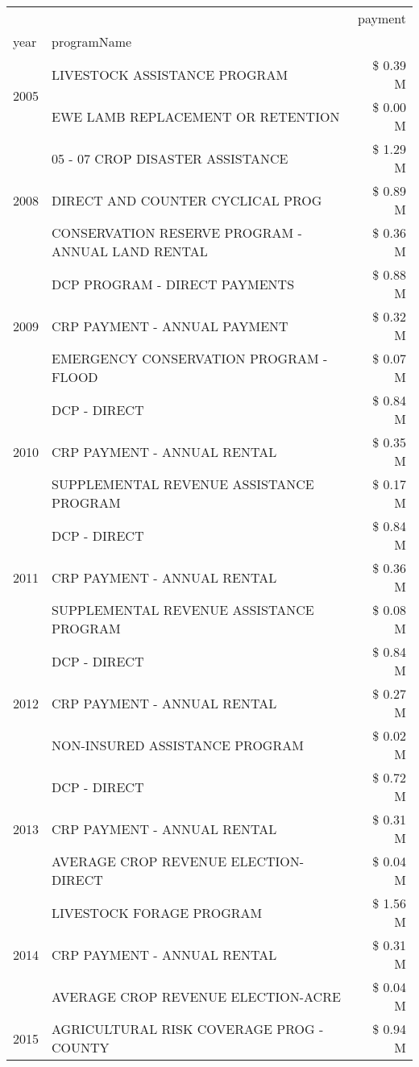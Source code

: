 \begin{tabular}{llr}
\toprule
 &  & payment \\
year & programName &  \\
\midrule
\multirow[t]{2}{*}{2005} & LIVESTOCK ASSISTANCE PROGRAM & \$ 0.39 M \\
 & EWE LAMB REPLACEMENT OR RETENTION & \$ 0.00 M \\
\cline{1-3}
\multirow[t]{3}{*}{2008} & 05 - 07 CROP DISASTER ASSISTANCE & \$ 1.29 M \\
 & DIRECT AND COUNTER CYCLICAL PROG & \$ 0.89 M \\
 & CONSERVATION RESERVE PROGRAM - ANNUAL LAND RENTAL & \$ 0.36 M \\
\cline{1-3}
\multirow[t]{3}{*}{2009} & DCP PROGRAM - DIRECT PAYMENTS & \$ 0.88 M \\
 & CRP PAYMENT - ANNUAL PAYMENT & \$ 0.32 M \\
 & EMERGENCY CONSERVATION PROGRAM - FLOOD & \$ 0.07 M \\
\cline{1-3}
\multirow[t]{3}{*}{2010} & DCP - DIRECT & \$ 0.84 M \\
 & CRP PAYMENT - ANNUAL RENTAL & \$ 0.35 M \\
 & SUPPLEMENTAL REVENUE ASSISTANCE PROGRAM & \$ 0.17 M \\
\cline{1-3}
\multirow[t]{3}{*}{2011} & DCP - DIRECT & \$ 0.84 M \\
 & CRP PAYMENT - ANNUAL RENTAL & \$ 0.36 M \\
 & SUPPLEMENTAL REVENUE ASSISTANCE PROGRAM & \$ 0.08 M \\
\cline{1-3}
\multirow[t]{3}{*}{2012} & DCP - DIRECT & \$ 0.84 M \\
 & CRP PAYMENT - ANNUAL RENTAL & \$ 0.27 M \\
 & NON-INSURED ASSISTANCE PROGRAM & \$ 0.02 M \\
\cline{1-3}
\multirow[t]{3}{*}{2013} & DCP - DIRECT & \$ 0.72 M \\
 & CRP PAYMENT - ANNUAL RENTAL & \$ 0.31 M \\
 & AVERAGE CROP REVENUE ELECTION-DIRECT & \$ 0.04 M \\
\cline{1-3}
\multirow[t]{3}{*}{2014} & LIVESTOCK FORAGE PROGRAM & \$ 1.56 M \\
 & CRP PAYMENT - ANNUAL RENTAL & \$ 0.31 M \\
 & AVERAGE CROP REVENUE ELECTION-ACRE & \$ 0.04 M \\
\cline{1-3}
\multirow[t]{3}{*}{2015} & AGRICULTURAL RISK COVERAGE PROG - COUNTY & \$ 0.94 M \\

\end{tabular}
